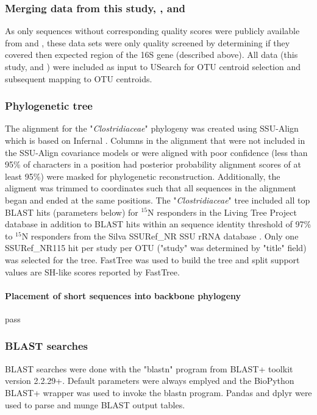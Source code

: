 \subsubsection{Merging data from this study, \citet{Garcia_Pichel_2013}, and \citet{Steven_2013}}
As only sequences without corresponding quality scores were publicly available from \citet{Garcia_Pichel_2013} and \citet{Steven_2013}, these data sets were only quality screened by determining if they covered then expected region of the 16S gene (described above). All data (this study, \citet{Garcia_Pichel_2013} and \citet{Steven_2013}) were included as input to USearch for OTU centroid selection and subsequent mapping to OTU centroids. 

\subsubsection{Phylogenetic tree}
The alignment for the "\textit{Clostridiaceae}" phylogeny was created using SSU-Align which is based on Infernal \cite{24008419, 19307242}. Columns in the alignment that were not included in the SSU-Align covariance models or were aligned with poor confidence (less than 95\% of characters in a position had posterior probability alignment scores of at least 95\%) were masked for phylogenetic reconstruction. Additionally, the aligment was trimmed to coordinates such that all sequences in the alignment began and ended at the same positions. The "\textit{Clostridiaceae}" tree included all top BLAST hits (parameters below) for $^{15}$N responders in the Living Tree Project database \cite{Yarza_2008} in addition to BLAST hits within an sequence identity threshold of 97\% to $^{15}$N responders from the Silva SSURef\_NR SSU rRNA database \cite{17947321}. Only one SSURef\_NR115 hit per study per OTU ("study" was determined by "title" field) was selected for the tree. FastTree \cite{20224823} was used to build the tree and split support values are SH-like scores reported by FastTree.

\paragraph{Placement of short sequences into backbone phylogeny}
pass

\subsubsection{BLAST searches}
BLAST searches were done with the "blastn" program from BLAST+ toolkit \cite{20003500} version 2.2.29+. Default parameters were always emplyed and the BioPython \cite{19304878} BLAST+ wrapper was used to invoke the blastn program. Pandas \cite{citeulike:11241428} and dplyr \cite{dplyr} were used to parse and munge BLAST output tables.  

